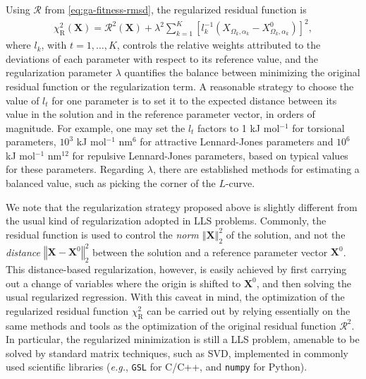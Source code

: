 \documentclass[10pt,a4paper,openany]{memoir}
\numberwithin{equation}{section}
\newcommand*\eg[0]{\textit{e.g.}}
\newcommand*\unitener{kJ mol$^{-1}$}
\newcommand*\unitljattr{kJ mol$^{-1}$ nm$^6$}
\newcommand*\unitljrepl{kJ mol$^{-1}$ nm$^{12}$}
\begin{document}
Using $\mathcal{R}$ from \autoref{eq:ga-fitness-rmsd}, the regularized
residual function is
\begin{align}\label{eq:chisq-regularized}
  \chi^2_\text{R}(\mathbf{X}) = \mathcal{R}^2(\mathbf{X}) + \lambda^2 \sum_{k=1}^{K} \left[ l_k^{-1}(X_{\Omega_k,\alpha_k}-X_{\Omega_k,\alpha_k}^0)\right]^2,
\end{align}
where $l_k$, with $t=1,\ldots,K$, controls the
relative weights attributed to the deviations of each parameter with
respect to its reference value, and the regularization parameter
$\lambda$ quantifies the balance between minimizing the original
residual function or the regularization term.
%
A reasonable strategy to choose the value of $l_t$ for one parameter
is to set it to the expected distance between its value in the
solution and in the reference parameter vector, in orders of
magnitude. For example, one may set the $l_t$ factors to 1 \unitener{}
for torsional parameters, $10^3$ \unitljattr{} for attractive
Lennard-Jones parameters and $10^6$ \unitljrepl{} for repulsive
Lennard-Jones parameters, based on typical values for these
parameters.
%
Regarding $\lambda$, there are established methods for estimating a
balanced value, such as picking the corner of the $L$-curve.

We note that the regularization strategy proposed above is slightly
different from the usual kind of regularization adopted in LLS
problems.  Commonly, the residual function is used to control the
\textit{norm} $\left\Vert{\mathbf{X}}\right\Vert^2_2$ of the solution,
and not the \textit{distance} $\left\Vert\mathbf{X} -
\mathbf{X}^{0}\right\Vert^2_2$ between the solution and a reference
parameter vector $\mathbf{X}^0$.  This distance-based regularization,
however, is easily achieved by first carrying out a change of
variables where the origin is shifted to $\mathbf{X}^0$, and then
solving the usual regularized regression.  With this caveat in mind,
the optimization of the regularized residual function
$\chi^2_\text{R}$ can be carried out by relying essentially on the
same methods and tools as the optimization of the original residual
function $\mathcal{R}^2$.
%
In particular, the regularized minimization is still a LLS problem,
amenable to be solved by standard matrix techniques, such as SVD,
implemented in commonly used scientific libraries (\eg{}, \texttt{GSL}
for C/C++, and \texttt{numpy} for Python).

%
\end{document}

